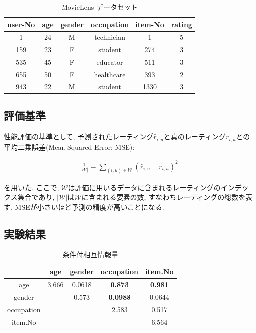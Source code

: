 \documentclass[a4j,12pt]{jarticle}
\begin{document}
\begin{table}[H]
\begin{center}
\caption{MovieLens データセット}   %
\begin{tabular}{|c|c|c|c|c|c|}
\hline
user-No	&	age	&	gender	&	occupation	&	item-No	& rating \\ \hline \hline
1	&	24	&	M	&	technician	&  1  & 5 \\	\hline
159	&    23	&     F	&      student	      &  274 & 3 \\	\hline
535	&	45	&	F	&	educator	&	511	& 3 \\ \hline
655	&	50	&	F	&	healthcare	& 393 & 2 \\	\hline
943	&	22	&	M	&	student	&	1330 & 3 \\  \hline
\end{tabular}
\end{center}
\end{table}
\subsection{評価基準}

性能評価の基準として, 予測されたレーティング$\hat{r}_{i, u}$と真のレーティング$r_{i, u}$との平均二乗誤差(Mean Squared Error: MSE):

\begin{eqnarray}
\label{MSE}
\frac{1}{|\mathcal W|} = \sum_{(i, u) \in \mathcal W} (\hat{r}_{i, u} - r_{i, u})^2
\end{eqnarray}

を用いた. ここで, $\mathcal W$は評価に用いるデータに含まれるレーティングのインデックス集合であり, $|\mathcal W|$は$\mathcal W$に含まれる要素の数, すなわちレーティングの総数を表す. MSEが小さいほど予測の精度が高いことになる.

\subsection{実験結果}

\begin{table}[H]
\begin{center}
\caption{条件付相互情報量}
\begin{tabular}{|c||c|c|c|c|} \hline  
& age & gender & occupation & item.No \\ \hline \hline
age & 3.666 & 0.0618 & \bf{0.873} & \bf{0.981} \\
gender &  & 0.573 & \bf{0.0988} & 0.0644 \\
occupation &  &  & 2.583 & 0.517 \\
item.No &  &  &  & 6.564 \\ \hline
\end{tabular}
\end{center}
\end{table}
\end{document}
